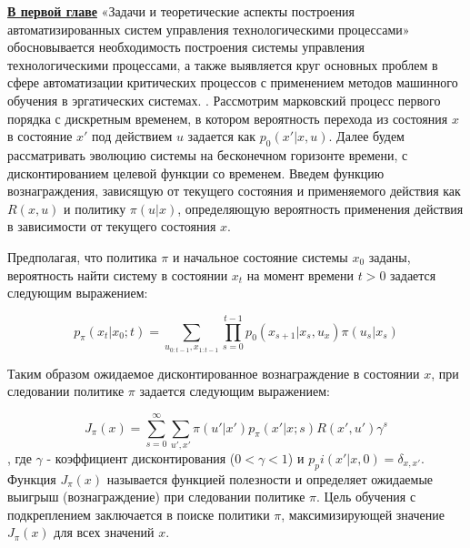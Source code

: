 \underline{\textbf{В первой главе}} «Задачи и теоретические аспекты построения автоматизированных систем управления технологическими процессами» обосновывается необходимость построения системы управления технологическими процессами, а также выявляется круг основных проблем  в сфере автоматизации критических процессов с применением методов машинного обучения в эргатических системах.
. \cite{book:963927, sutton1998introduction}
Рассмотрим марковский процесс первого порядка с дискретным временем, в котором  вероятность перехода из состояния $x$ в состояние $x'$ под действием $u$ задается как $p_0(x'|x,u)$.  Далее будем рассматривать эволюцию системы на бесконечном горизонте времени, с дисконтированием целевой функции со временем. Введем функцию вознаграждения, зависящую от текущего состояния и применяемого действия  как $R(x,u)$ и политику $\pi(u|x)$, определяющую вероятность применения действия в зависимости от текущего состояния $x$.

Предполагая, что политика $\pi$ и начальное состояние системы $x_0$ заданы, вероятность найти систему в состоянии $x_t$ на момент времени $t > 0$ задается следующим выражением:

\begin{equation}
    \label{eq:pxxt}
     p_\pi(x_t|x_0; t) =
     \sum_{u_{0:t−1}, x_{1:t−1}}{
     	\prod_{s=0}^{t-1} {
        	p_0(x_{s+1}|x_s, u_x) \pi(u_s|x_s)
         }
      }
\end{equation}

Таким образом ожидаемое дисконтированное вознаграждение в состоянии $x$, при следовании политике $\pi$ задается следующим выражением:

\begin{equation}
    \label{eq:j_pi}
     J_{\pi}(x) =
     \sum_{s=0}^{\infty}
       \sum_{u', x'}{
          \pi(u'|x')p_\pi(x'|x; s)R(x', u')\gamma^s
        }
\end{equation}
, где $\gamma$ - коэффициент дисконтирования ($0 < \gamma < 1$) и $p_pi(x'|x, 0) = \delta_{x,x'}$. Функция $J_\pi(x)$ называется функцией полезности и определяет ожидаемые выигрыш (вознаграждение) при следовании политике $\pi$. Цель обучения с подкреплением заключается в поиске политики $\pi$, максимизирующей значение $J_\pi(x)$ для всех значений $x$.

